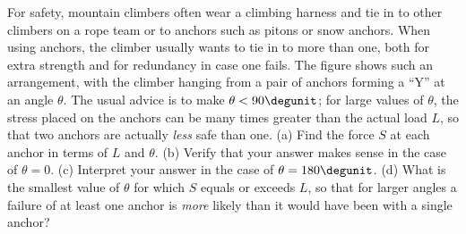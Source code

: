 For safety, mountain climbers often wear a climbing harness and tie in to other climbers on a rope
team or to anchors such as pitons or snow anchors. When using anchors, the climber usually wants to tie in
to more than one, both for extra strength and for redundancy in case one fails.
The figure shows such an arrangement, with the climber hanging from a pair of anchors forming a ``Y''
at an angle $\theta$.  The usual advice is to make $\theta<90\degunit$; for large values of $\theta$,
the stress placed on the anchors can be many times greater than the actual load $L$,
so that two anchors are actually \emph{less} safe than one.\hwendpart
(a) Find the force $S$ at each anchor in terms of $L$ and $\theta$.  \answercheck\hwendpart
(b) Verify that your answer makes sense in the case of $\theta=0$.\hwendpart
(c) Interpret your answer in the case of $\theta=180\degunit$.\hwendpart
(d) What is the smallest value of $\theta$ for which $S$ equals or exceeds $L$, so that for larger angles a failure
of at least one anchor is \emph{more} likely than it would have been with a single anchor?\answercheck\hwendpart
